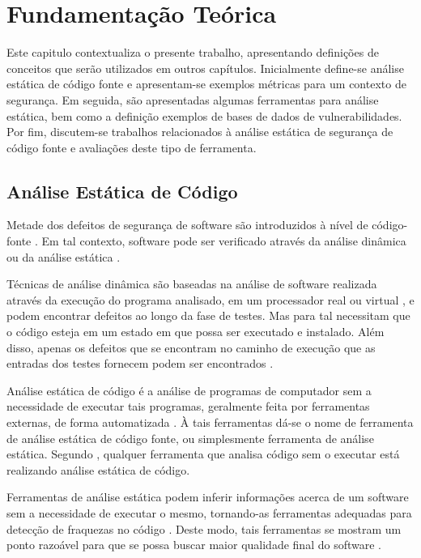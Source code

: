 \chapter{Fundamentação Teórica}\label{fundamentacao_teorica}

Este capitulo contextualiza o presente trabalho, apresentando definições de conceitos que serão utilizados em outros capítulos. Inicialmente define-se análise estática de código fonte e apresentam-se exemplos métricas para um contexto de segurança. Em seguida, são apresentadas algumas ferramentas para análise estática, bem como a definição exemplos de bases de dados de vulnerabilidades. Por fim, discutem-se trabalhos relacionados à análise estática de segurança de código fonte e avaliações deste tipo de ferramenta.

\section{Análise Estática de Código}\label{fundamentacao_teorica:analise_estatica_de_codigo}

Metade dos defeitos de segurança de software são introduzidos à nível de código-fonte \cite{vadim}. Em tal contexto, software pode ser verificado através da análise dinâmica ou da análise estática \cite{concolic}.

Técnicas de análise dinâmica são baseadas na análise de software realizada através da execução do programa analisado, em um processador real ou virtual \cite{concolic}, e podem encontrar defeitos ao longo da fase de testes. Mas para tal necessitam que o código esteja em um estado em que possa ser executado e instalado. Além disso, apenas os defeitos que se encontram no caminho de execução que as entradas dos testes fornecem podem ser encontrados \cite{harvard}.

Análise estática de código é a análise de programas de computador sem a necessidade de executar tais programas, geralmente feita por ferramentas externas, de forma automatizada \cite{kannavara}. À tais ferramentas dá-se o nome de ferramenta de análise estática de código fonte, ou simplesmente ferramenta de análise estática. Segundo \cite{secure_programming}, qualquer ferramenta que analisa código sem o executar está realizando análise estática de código.

Ferramentas de análise estática podem inferir informações  acerca de um software sem a necessidade de executar o mesmo, tornando-as ferramentas adequadas para detecção de fraquezas no código \cite{vadim}. Deste modo, tais ferramentas se mostram um ponto razoável para que se possa buscar maior qualidade final do software \cite{sa_spec}.

